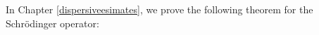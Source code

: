 \documentclass[12pt,oneside,onecolumn,open]{article}
\begin{document}
  
\color{black}

 In Chapter \ref{dispersiveesimates}, we prove the following theorem for the Schr\"odinger operator:
\end{document}
